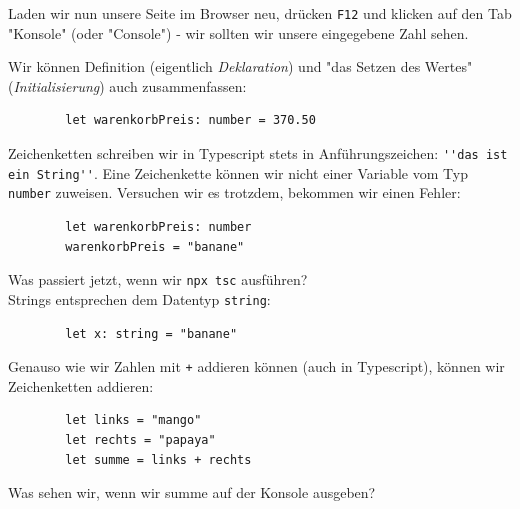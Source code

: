\documentclass[11pt]{article}
\begin{document}
    Laden wir nun unsere Seite im Browser neu, drücken \Verb"F12" und klicken auf
    den Tab "Konsole" (oder "Console") - wir sollten wir unsere eingegebene Zahl sehen.

    Wir können Definition (eigentlich \textit{Deklaration}) und "das Setzen des Wertes" (\textit{Initialisierung})
    auch zusammenfassen:

    \begin{verbatim}
        let warenkorbPreis: number = 370.50
    \end{verbatim}

    Zeichenketten schreiben wir in Typescript stets in Anführungszeichen: \Verb"''das ist ein String''".
    Eine Zeichenkette können wir nicht einer Variable vom Typ \Verb"number" zuweisen.
    Versuchen wir es trotzdem, bekommen wir einen Fehler:

    \begin{verbatim}
        let warenkorbPreis: number
        warenkorbPreis = "banane"
    \end{verbatim}

    Was passiert jetzt, wenn wir \Verb"npx tsc" ausführen? \\

    Strings entsprechen dem Datentyp \Verb"string":

    \begin{verbatim}
        let x: string = "banane"
    \end{verbatim}

    Genauso wie wir Zahlen mit \Verb"+" addieren können (auch in Typescript), können wir Zeichenketten
    addieren:

    \begin{verbatim}
        let links = "mango"
        let rechts = "papaya"
        let summe = links + rechts
    \end{verbatim}

    Was sehen wir, wenn wir summe auf der Konsole ausgeben?
\end{document}
